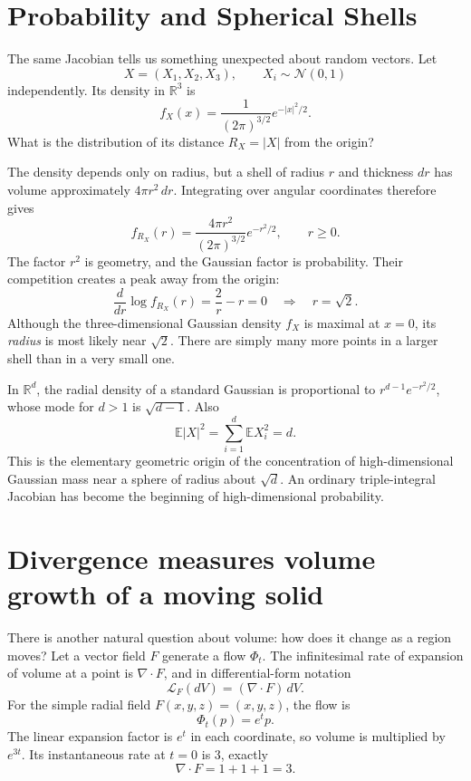\section{Probability and Spherical Shells}

The same Jacobian tells us something unexpected about random vectors. Let
\[
 X=(X_1,X_2,X_3),\qquad X_i\sim\mathcal N(0,1)
\]
independently. Its density in \(\mathbb R^3\) is
\[
 f_X(x)=\frac{1}{(2\pi)^{3/2}}
          e^{-|x|^2/2}.
\]
What is the distribution of its distance \(R_X=|X|\) from the origin?

The density depends only on radius, but a shell of radius \(r\) and thickness \(dr\) has volume approximately \(4\pi r^2\,dr\). Integrating over angular coordinates therefore gives
\[
 \boxed{f_{R_X}(r)=
 \frac{4\pi r^2}{(2\pi)^{3/2}}e^{-r^2/2},
 \qquad r\ge0.}
\]
The factor \(r^2\) is geometry, and the Gaussian factor is probability. Their competition creates a peak away from the origin:
\[
 \frac{d}{dr}\log f_{R_X}(r)
 =\frac2r-r=0
 \quad\Longrightarrow\quad r=\sqrt2.
\]
Although the three-dimensional Gaussian density \(f_X\) is maximal at \(x=0\), its \emph{radius} is most likely near \(\sqrt2\). There are simply many more points in a larger shell than in a very small one.

In \(\mathbb R^d\), the radial density of a standard Gaussian is proportional to \(r^{d-1}e^{-r^2/2}\), whose mode for \(d>1\) is \(\sqrt{d-1}\). Also
\[
 \mathbb E|X|^2=\sum_{i=1}^d\mathbb E X_i^2=d.
\]
This is the elementary geometric origin of the concentration of high-dimensional Gaussian mass near a sphere of radius about \(\sqrt d\). An ordinary triple-integral Jacobian has become the beginning of high-dimensional probability.

\section{Divergence measures volume growth of a moving solid}

There is another natural question about volume: how does it change as a region moves? Let a vector field \(F\) generate a flow \(\Phi_t\). The infinitesimal rate of expansion of volume at a point is \(\nabla\cdot F\), and in differential-form notation
\[
 \mathcal L_F(dV)=(\nabla\cdot F)\,dV.
\]
For the simple radial field \(F(x,y,z)=(x,y,z)\), the flow is
\[
 \Phi_t(p)=e^tp.
\]
The linear expansion factor is \(e^t\) in each coordinate, so volume is multiplied by \(e^{3t}\). Its instantaneous rate at \(t=0\) is \(3\), exactly
\[
 \nabla\cdot F=1+1+1=3.
\]

